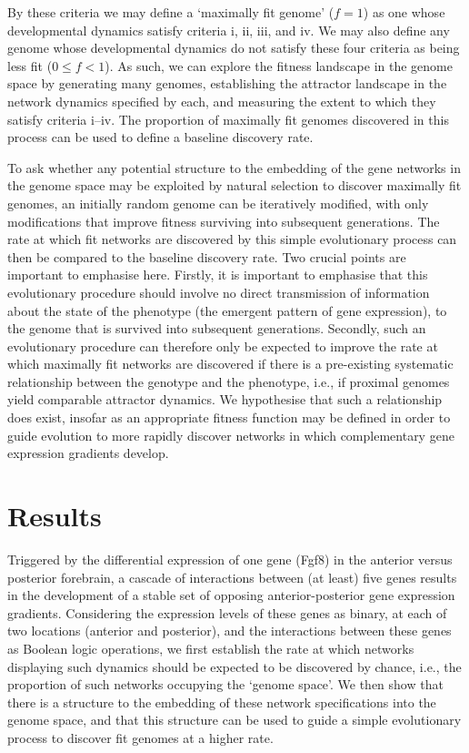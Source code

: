 \documentclass[10pt,letterpaper]{article}
\begin{document}
By these criteria we may define a `maximally fit genome' ($f=1$) as one whose developmental dynamics satisfy criteria i, ii, iii, and iv. We may also define any genome whose developmental dynamics do not satisfy these four criteria as being less fit ($0\leq f<1$). As such, we can explore the fitness landscape in the genome space by generating many genomes, establishing the attractor landscape in the network dynamics specified by each, and measuring the extent to which they satisfy criteria i--iv. The proportion of maximally fit genomes discovered in this process can be used to define a baseline discovery rate.

To ask whether any potential structure to the embedding of the gene networks in the genome space may be exploited by natural selection to discover maximally fit genomes, an initially random genome can be iteratively modified, with only modifications that improve fitness surviving into subsequent generations. The rate at which fit networks are discovered by this simple evolutionary process can then be compared to the baseline discovery rate. Two crucial points are important to emphasise here. Firstly, it is important to emphasise that this evolutionary procedure should involve no direct transmission of information about the state of the phenotype (the emergent pattern of gene expression), to the genome that is survived into subsequent generations. Secondly, such an evolutionary procedure can therefore only be expected to improve the rate at which maximally fit networks are discovered if there is a pre-existing systematic relationship between the genotype and the phenotype, i.e., if proximal genomes yield comparable attractor dynamics. We hypothesise that such a relationship does exist, insofar as an appropriate fitness function may be defined in order to guide evolution to more rapidly discover networks in which complementary gene expression gradients develop.

\section*{Results}

Triggered by the differential expression of one gene (Fgf8) in the anterior versus posterior forebrain, a cascade of interactions between (at least) five genes results in the development of a stable set of opposing anterior-posterior gene expression gradients. Considering the expression levels of these genes as binary, at each of two locations (anterior and posterior), and the interactions between these genes as Boolean logic operations, we first establish the rate at which networks displaying such dynamics should be expected to be discovered by chance, i.e., the proportion of such networks occupying the `genome space'. We then show that there is a structure to the embedding of these network specifications into the genome space, and that this structure can be used to guide a simple evolutionary process to discover fit genomes at a higher rate.
\end{document}
